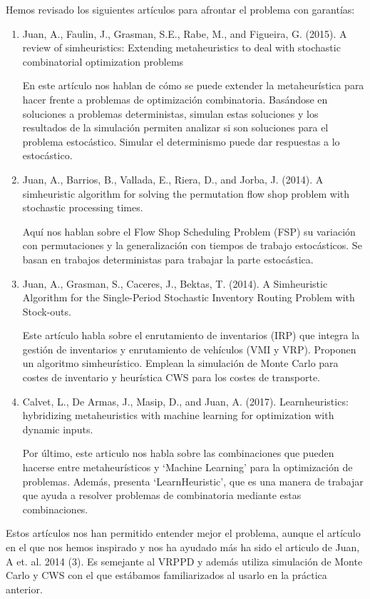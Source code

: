 \documentclass[11pt]{article} %
\begin{document}
\begin{enumerate}
Hemos revisado los siguientes artículos para afrontar el problema con garantías:
	\begin{enumerate}
		\item Juan, A., Faulin, J., Grasman, S.E., Rabe, M., and Figueira, G. (2015). A review of simheuristics: Extending metaheuristics to deal with stochastic combinatorial optimization problems
		
		En este artículo nos hablan de cómo se puede extender la metaheurística para hacer frente a problemas de optimización combinatoria. Basándose en soluciones a problemas deterministas, simulan estas soluciones y los resultados de la simulación permiten analizar si son soluciones para el problema estocástico. 
		Simular el determinismo puede dar respuestas a lo estocástico.
		
		\item Juan, A., Barrios, B., Vallada, E., Riera, D., and Jorba, J. (2014). A simheuristic algorithm for solving the permutation flow shop problem with stochastic processing times.
		
		Aquí nos hablan sobre el Flow Shop Scheduling Problem (FSP) su variación con permutaciones y la generalización con tiempos de trabajo estocásticos. Se basan en trabajos deterministas para trabajar la parte estocástica.
		
		\item Juan, A., Grasman, S., Caceres, J., Bektas, T. (2014). A Simheuristic Algorithm for the Single-Period Stochastic Inventory Routing Problem with Stock-outs.
		
		Este artículo habla sobre el enrutamiento de inventarios (IRP) que integra la gestión de inventarios y enrutamiento de vehículos (VMI y VRP). Proponen un algoritmo simheurístico. Emplean la simulación de Monte Carlo para costes de inventario y heurística CWS para los costes de transporte.
		
		\item Calvet, L., De Armas, J., Masip, D., and Juan, A. (2017). Learnheuristics: hybridizing metaheuristics with machine learning for optimization with dynamic inputs.
		
		Por último, este articulo nos habla sobre las combinaciones que pueden hacerse entre metaheurísticos y ‘Machine Learning’ para la optimización de problemas. Además, presenta ‘LearnHeuristic’, que es una manera de trabajar que ayuda a resolver problemas de combinatoria mediante estas combinaciones.
\end{enumerate}

Estos artículos nos han permitido entender mejor el problema, aunque el artículo en el que nos hemos inspirado y nos ha ayudado más ha sido el articulo de Juan, A et. al. 2014 (3). Es semejante al VRPPD y además utiliza simulación de Monte Carlo y CWS con el que estábamos familiarizados al usarlo en la práctica anterior.



\end{enumerate}
\end{document}
